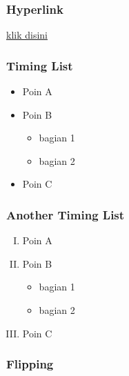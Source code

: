 \documentclass[handout]{beamer}
\begin{document}

\begin{frame}
\frametitle{Hyperlink}
\label{contens}
\hyperlink{contents}{klik disini}

\hyperlink{contents}{}

\hyperlink{contents}{}

\hyperlink{contents}{}

\hyperlink{contents}{}
\end{frame}



\begin{frame}
\frametitle{Timing List}
	\begin{itemize}
		\pause
		\item Poin A
		\pause
		\item Poin B
		\begin{itemize}
			\pause
			\item bagian 1
			\pause
			\item bagian 2
		\end{itemize}
		\pause
		\item Poin C
	\end{itemize}
\end{frame}



\begin{frame}
\frametitle{Another Timing List}
\begin{enumerate}[(I)]
	\item<1-> Poin A
	\item<2-> Poin B
	\begin{itemize}
		\item<3-> bagian 1
		\item<4-> bagian 2
	\end{itemize}
	\item<5-> Poin C
\end{enumerate}
\end{frame}



\begin{frame}
\frametitle{Flipping}

\end{frame}
\end{document}

